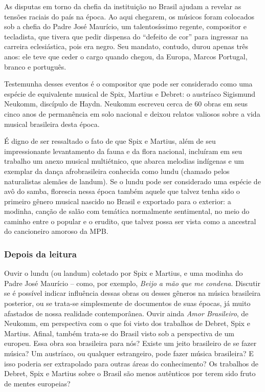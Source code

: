 \documentclass[11pt]{extarticle}
\begin{document}
As disputas em torno da chefia da instituição no Brasil ajudam a revelar as
tensões raciais do país na época. Ao aqui chegarem, os músicos foram colocados
sob a chefia do Padre José Maurício, um talentosíssimo regente, compositor e
tecladista, que tivera que pedir dispensa do “defeito de cor” para ingressar na
carreira eclesiástica, pois era negro. Seu mandato, contudo, durou apenas três
anos: ele teve que ceder o cargo quando chegou, da Europa, Marcos Portugal,
branco e português.

Testemunha desses eventos é o compositor que pode ser considerado como uma
espécie de equivalente musical de Spix, Martius e Debret: o austríaco Sigismund
Neukomm, discípulo de Haydn. Neukomm escreveu cerca de 60 obras em seus cinco
anos de permanência em solo nacional e deixou relatos valiosos sobre a vida
musical brasileira desta época.

É digno de ser ressaltado o fato de que Spix e Martius, além de seu
impressionante levantamento da fauna e da flora nacional, incluíram em seu
trabalho um anexo musical multiétnico, que abarca melodias indígenas e um
exemplar da dança afrobrasileira conhecida como lundu (chamado pelos
naturalistas alemães de landum). Se o lundu pode ser considerado uma espécie de
avô do samba, florescia nessa época também aquele que talvez tenha sido o
primeiro gênero musical nascido no Brasil e exportado para o exterior: a
modinha, canção de salão com temática normalmente sentimental, no meio do
caminho entre o popular e o erudito, que talvez possa ser vista como a
ancestral do cancioneiro amoroso da MPB.

\subsubsection{Depois da leitura}

Ouvir o lundu (ou landum) coletado por Spix e Martius, e uma modinha do Padre
José Maurício – como, por exemplo, \emph{Beijo a mão que me condena}. Discutir se é
possível indicar influência dessas obras ou desses gêneros na música brasileira
posterior, ou se trata-se simplesmente de documentos de suas épocas, já muito
afastados de nossa realidade contemporânea. Ouvir ainda \emph{Amor Brasileiro}, de
Neukomm, em perspectiva com o que foi visto dos trabalhos de Debret, Spix e
Martius. Afinal, também trata-se do Brasil visto sob a perspectiva de um
europeu. Essa obra soa brasileira para nós? Existe um jeito brasileiro de se
fazer música? Um austríaco, ou qualquer estrangeiro, pode fazer música
brasileira? E isso poderia ser extrapolado para outras áreas do conhecimento?
Os trabalhos de Debret, Spix e Martius sobre o Brasil são menos autênticos por
terem sido fruto de mentes europeias?
\end{document}

